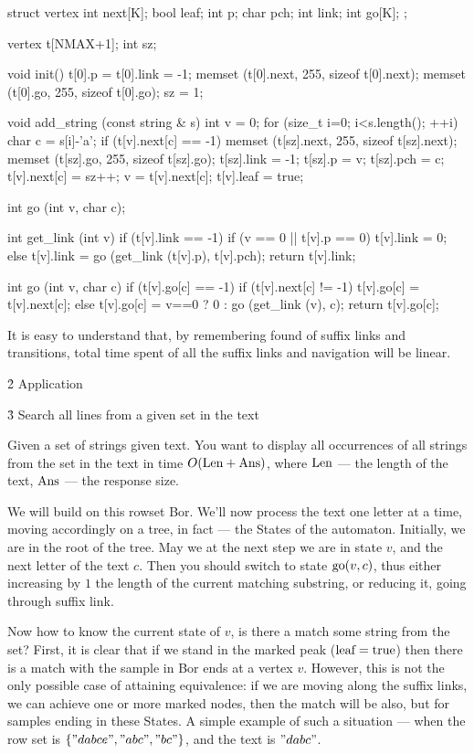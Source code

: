 \code
struct vertex {
int next[K];
bool leaf;
int p;
char pch;
int link;
int go[K];
};

vertex t[NMAX+1];
int sz;

void init() {
t[0].p = t[0].link = -1;
memset (t[0].next, 255, sizeof t[0].next);
memset (t[0].go, 255, sizeof t[0].go);
sz = 1;
}

void add_string (const string & s) {
int v = 0;
for (size_t i=0; i<s.length(); ++i) {
char c = s[i]-'a';
if (t[v].next[c] == -1) {
memset (t[sz].next, 255, sizeof t[sz].next);
memset (t[sz].go, 255, sizeof t[sz].go);
t[sz].link = -1;
t[sz].p = v;
t[sz].pch = c;
t[v].next[c] = sz++;
}
v = t[v].next[c];
}
t[v].leaf = true;
}

int go (int v, char c);

int get_link (int v) {
if (t[v].link == -1)
if (v == 0 || t[v].p == 0)
t[v].link = 0;
else
t[v].link = go (get_link (t[v].p), t[v].pch);
return t[v].link;
}

int go (int v, char c) {
if (t[v].go[c] == -1)
if (t[v].next[c] != -1)
t[v].go[c] = t[v].next[c];
else
t[v].go[c] = v==0 ? 0 : go (get_link (v), c);
return t[v].go[c];
}
\endcode

It is easy to understand that, by remembering found of suffix links and transitions, total time spent of all the suffix links and navigation will be linear.


\h2{ Application }

\h3{ Search all lines from a given set in the text }

Given a set of strings given text. You want to display all occurrences of all strings from the set in the text in time $O ({\rm Len + Ans})$, where $\rm Len$ --- the length of the text, $\rm Ans$ --- the response size.

We will build on this rowset Bor. We'll now process the text one letter at a time, moving accordingly on a tree, in fact --- the States of the automaton. Initially, we are in the root of the tree. May we at the next step we are in state $v$, and the next letter of the text $c$. Then you should switch to state ${\rm go} (v, c)$, thus either increasing by $1$ the length of the current matching substring, or reducing it, going through suffix link.

Now how to know the current state of $v$, is there a match some string from the set? First, it is clear that if we stand in the marked peak ($\rm leaf=true$) then there is a match with the sample in Bor ends at a vertex $v$. However, this is not the only possible case of attaining equivalence: if we are moving along the suffix links, we can achieve one or more marked nodes, then the match will be also, but for samples ending in these States. A simple example of such a situation --- when the row set is $\{ "dabce", "abc", "bc" \}$, and the text is $"dabc"$.

